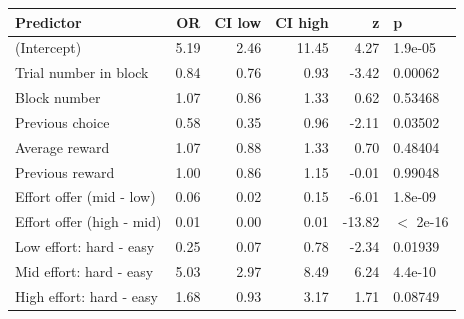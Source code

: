 \begin{table}[ht]
\centering
\begin{tabular}{lrrrrl}
  \hline
Predictor & OR & CI low & CI high & z & p \\ 
  \hline
(Intercept) & 5.19 & 2.46 & 11.45 & 4.27 & 1.9e-05 \\ 
  Trial number in block & 0.84 & 0.76 & 0.93 & -3.42 & 0.00062 \\ 
  Block number & 1.07 & 0.86 & 1.33 & 0.62 & 0.53468 \\ 
  Previous choice & 0.58 & 0.35 & 0.96 & -2.11 & 0.03502 \\ 
  Average reward & 1.07 & 0.88 & 1.33 & 0.70 & 0.48404 \\ 
  Previous reward & 1.00 & 0.86 & 1.15 & -0.01 & 0.99048 \\ 
  Effort offer (mid - low) & 0.06 & 0.02 & 0.15 & -6.01 & 1.8e-09 \\ 
  Effort offer (high - mid) & 0.01 & 0.00 & 0.01 & -13.82 & $<$ 2e-16 \\ 
  Low effort: hard - easy & 0.25 & 0.07 & 0.78 & -2.34 & 0.01939 \\ 
  Mid effort: hard - easy & 5.03 & 2.97 & 8.49 & 6.24 & 4.4e-10 \\ 
  High effort: hard - easy & 1.68 & 0.93 & 3.17 & 1.71 & 0.08749 \\ 
   \hline
\end{tabular}
\end{table}
